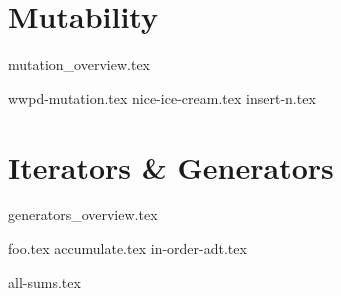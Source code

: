 \documentclass{exam}
\begin{document}
\section{Mutability}
	{mutation_overview.tex}
	\begin{questions}
		{wwpd-mutation.tex}
    {nice-ice-cream.tex}
    {insert-n.tex}
	\end{questions}

\newpage
\section{Iterators \& Generators}
{generators_overview.tex}
\begin{questions}
    {foo.tex}
{accumulate.tex}
{in-order-adt.tex}

{all-sums.tex}


\end{questions}
\end{document}
